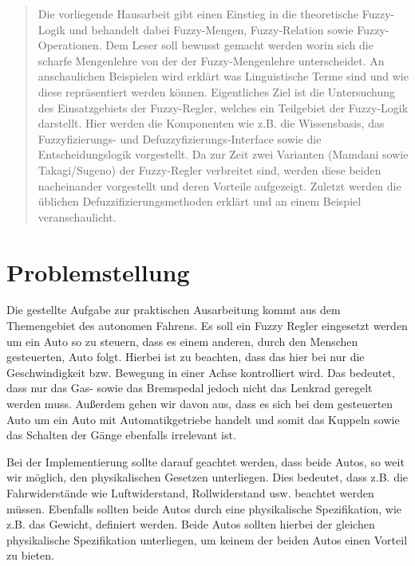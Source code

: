 \documentclass[12pt,a4paper,bibliography=totocnumbered,listof=totocnumbered, abstracton]{scrartcl}
\theoremstyle{Umgebung}
\begin{document}
\begin{abstract} 
	Die vorliegende Hausarbeit gibt einen Einstieg in die theoretische Fuzzy-Logik und behandelt dabei Fuzzy-Mengen, Fuzzy-Relation sowie Fuzzy-Operationen. Dem Leser soll bewusst gemacht werden worin sich die scharfe Mengenlehre von der der Fuzzy-Mengenlehre unterscheidet. An anschaulichen Beispielen wird erklärt was Linguistische Terme sind und wie diese repräsentiert werden können. Eigentliches Ziel ist die Untersuchung des Einsatzgebiets der Fuzzy-Regler, welches ein Teilgebiet der Fuzzy-Logik darstellt. Hier werden die Komponenten wie z.B. die Wissensbasis, das Fuzzyfizierungs- und Defuzzyfizierungs-Interface sowie die Entscheidungslogik vorgestellt. Da zur Zeit zwei Varianten (Mamdani sowie Takagi/Sugeno)  der Fuzzy-Regler verbreitet sind, werden diese beiden nacheinander vorgestellt und deren Vorteile aufgezeigt. Zuletzt werden die üblichen Defuzzifizierungsmethoden erklärt und an einem Beispiel veranschaulicht.
\end{abstract} 
\newpage

\section{Problemstellung}

Die gestellte Aufgabe zur praktischen Ausarbeitung kommt aus dem Themengebiet des autonomen Fahrens. Es soll ein Fuzzy Regler eingesetzt werden um ein Auto so zu steuern, dass es einem anderen, durch den Menschen gesteuerten, Auto folgt.  Hierbei ist zu beachten, dass das hier bei nur die Geschwindigkeit bzw. Bewegung in einer Achse kontrolliert wird. Das bedeutet, dass nur das Gas- sowie das Bremspedal jedoch nicht das Lenkrad geregelt werden muss. Außerdem gehen wir davon aus, dass es sich bei dem gesteuerten Auto um ein Auto mit Automatikgetriebe handelt und somit das Kuppeln sowie das Schalten der Gänge ebenfalls irrelevant ist. 

Bei der Implementierung sollte darauf geachtet werden, dass beide Autos, so weit wir möglich, den physikalischen Gesetzen unterliegen. Dies bedeutet, dass z.B. die Fahrwiderstände wie Luftwiderstand, Rollwiderstand usw. beachtet werden müssen. Ebenfalls sollten beide Autos durch eine physikalische Spezifikation, wie z.B. das Gewicht, definiert werden. Beide Autos sollten hierbei der gleichen physikalische Spezifikation unterliegen, um keinem der beiden Autos einen Vorteil zu bieten.
\end{document}

